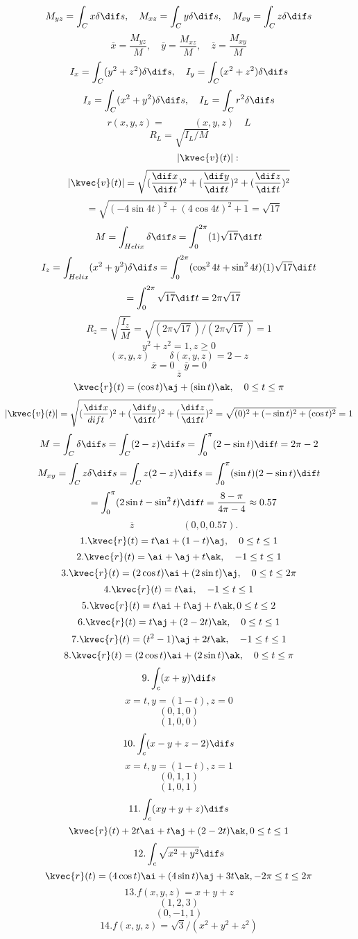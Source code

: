 \[M_{yz} = \int_{C} x\delta \dif s,\quad M_{xz}=\int_{C} y\delta \dif s,\quad M_{xy}=\int_{C} z\delta \dif s\]
\[\overline{x} =\frac{M_{yz}}{M},\quad \overline{y}= \frac{M_{xz}}{M},\quad \overline{z}= \frac{M_{xy}}{M}\]
\[I_x =\int_{C}(y^2 + z^2)\delta \dif s, \quad I_y =\int_{C}(x^2 + z^2)\delta \dif s\]
\[I_z = \int_{C}(x^2 + y^2)\delta \dif s, \quad I_L=\int_{C}r^2\delta \dif s\]
\[r(x, y, z)=\quad \quad \quad (x,y,z) \quad L\]
\[R_{L} =\sqrt{I_{L}/M}\]
\[\quad \quad \quad \quad \quad \quad |\kvec{v}(t)| :\]
\[|\kvec{v}(t)| = \sqrt{(\frac{\dif x}{\dif t})^2 + (\frac{\dif y}{\dif t})^2 + (\frac{\dif z}{\dif t})^2}\]
\[\quad = \sqrt{(-4 \sin{4t})^2 + (4 \cos{4t})^2 +1} =\sqrt{17}\]
\[M= \int_{Helix}\delta \dif s = \int_{0}^{2\pi}(1)\sqrt{17}\dif t\]
\[I_z=\int_{Helix}(x^2 + y^2)\delta\dif s = \int_{0}^{2\pi}(\cos^{2}4t + \sin^{2}4t)(1)\sqrt{17}\dif t\]
\[\quad = \int_{0}^{2\pi}\sqrt{17}\dif t=2\pi\sqrt{17}\]
\[R_z=\sqrt{\frac{I_z}{M}} = \sqrt{(2\pi\sqrt{17})/(2\pi\sqrt{17})} = 1\]
\[y^2 + z^2 = 1, z\geq 0\]
\[(x,y,z) \quad \quad \delta(x,y,z) = 2-z\]
\[\overline{x} = 0 \quad \overline{y}=0\]
\[\overline{z}\]
\[\kvec{r}(t) =(\cos{t})\aj + (\sin{t})\ak, \quad 0\leq t\leq\pi\]
\[|\kvec{v}(t)| = \sqrt{(\frac{\dif x}{dif t})^2 + (\frac{\dif y}{\dif t})^2 + (\frac{\dif z}{\dif t})^2} = \sqrt{(0)^2 + (-\sin{t})^2 + (\cos{t})^2} =1\]
\[M = \int_{C}\delta\dif s =\int_{C}(2-z)\dif s = \int_{0}^{\pi}(2-\sin{t})\dif t = 2\pi - 2\]
\[M_{xy} = \int_{C}z\delta\dif s = \int_{C}z(2-z)\dif s = \int_{0}^{\pi}(\sin{t})(2-\sin{t})\dif t\]
\[\quad = \int_{0}^{\pi}(2\sin{t} -\sin^{2}t)\dif t = \frac{8-\pi}{4\pi -4}\approx 0.57\]
\[\quad \overline{z}\quad\quad\quad\quad\quad(0, 0, 0.57).\]
\[1.\kvec{r}(t) = t\ai + (1-t)\aj, \quad 0\leq t\leq 1\]
\[2.\kvec{r}(t) = \ai + \aj + t\ak,\quad -1\leq t \leq 1\]
\[3.\kvec{r}(t) = (2\cos{t})\ai + (2\sin{t})\aj,\quad 0\leq t\leq 2\pi\]
\[4.\kvec{r}(t) = t\ai, \quad -1\leq t\leq 1\]
\[5.\kvec{r}(t) = t\ai + t\aj + t\ak, 0\leq t\leq 2\]
\[6.\kvec{r}(t) = t\aj + (2-2t)\ak,\quad 0\leq t\leq 1\]
\[7.\kvec{r}(t) = (t^2 - 1)\aj + 2t\ak,\quad -1\leq t\leq 1\]
\[8.\kvec{r}(t) = (2\cos{t})\ai + (2\sin{t})\ak,\quad 0\leq t\leq\pi\]
\[9. \int_{c}(x+y)\dif s\]
\[x=t,y=(1-t),z=0\]
\[(0,1,0)\]
\[(1,0,0)\]
\[10. \int_{c}(x-y+z-2)\dif s\]
\[x=t,y=(1-t),z=1\]
\[(0,1,1)\]
\[(1,0,1)\]
\[11. \int_{c}(xy+y+z)\dif s\]
\[\kvec{r}(t)+2t\ai+t\aj+(2-2t)\ak, 0\le t \le 1\]
\[12. \int_{c}\sqrt{x^{2}+y^{2}}\dif s\]
\[\kvec{r}(t)=(4\cos{t})\ai+(4\sin{t})\aj+3t\ak, -2\pi\le t\le2\pi\]
\[13. f(x,y,z)=x+y+z\]
\[(1,2,3)\]
\[(0,-1,1)\]
\[14. f(x,y,z)=\sqrt{3}/(x^{2}+y^{2}+z^{2})\]
